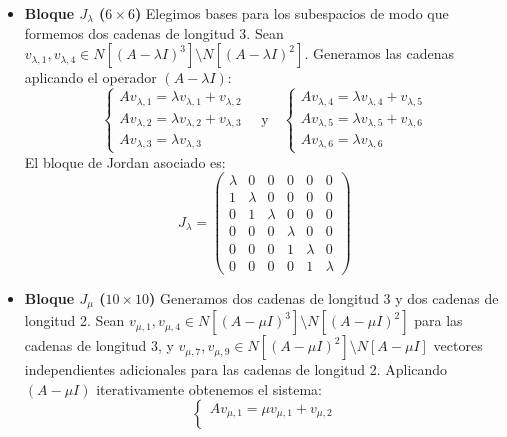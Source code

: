{    \begin{itemize}
        \item \textbf{Bloque $J_\lambda$ ($6 \times 6$)}
        Elegimos bases para los subespacios de modo que formemos dos cadenas de longitud 3.
        Sean $v_{\lambda,1}, v_{\lambda,4} \in N[(A - \lambda I)^3] \setminus N[(A - \lambda I)^2]$. Generamos las cadenas aplicando el operador $(A - \lambda I)$:
        \[
            \begin{cases}
                A v_{\lambda,1} = \lambda v_{\lambda,1} + v_{\lambda,2} \\
                A v_{\lambda,2} = \lambda v_{\lambda,2} + v_{\lambda,3} \\
                A v_{\lambda,3} = \lambda v_{\lambda,3}
            \end{cases}
            \quad \text{y} \quad
            \begin{cases}
                A v_{\lambda,4} = \lambda v_{\lambda,4} + v_{\lambda,5} \\
                A v_{\lambda,5} = \lambda v_{\lambda,5} + v_{\lambda,6} \\
                A v_{\lambda,6} = \lambda v_{\lambda,6}
            \end{cases}
        \]
        El bloque de Jordan asociado es:
        \[
            J_\lambda = 
            \begin{pmatrix}
                \lambda & 0 & 0 & 0 & 0 & 0 \\
                1 & \lambda & 0 & 0 & 0 & 0 \\
                0 & 1 & \lambda & 0 & 0 & 0 \\
                0 & 0 & 0 & \lambda & 0 & 0 \\
                0 & 0 & 0 & 1 & \lambda & 0 \\
                0 & 0 & 0 & 0 & 1 & \lambda
            \end{pmatrix}
        \]
        \item \textbf{Bloque $J_\mu$ ($10 \times 10$)}
        Generamos dos cadenas de longitud 3 y dos cadenas de longitud 2.
        Sean $v_{\mu,1}, v_{\mu,4} \in N[(A - \mu I)^3] \setminus N[(A - \mu I)^2]$ para las cadenas de longitud 3, y $v_{\mu,7}, v_{\mu,9} \in N[(A - \mu I)^2] \setminus N[A - \mu I]$ vectores independientes adicionales para las cadenas de longitud 2. Aplicando $(A-\mu I)$ iterativamente obtenemos el sistema:
        \[
            \begin{cases}
                A v_{\mu,1} = \mu v_{\mu,1} + v_{\mu,2} \\

\end{cases}\]
\end{itemize}}
